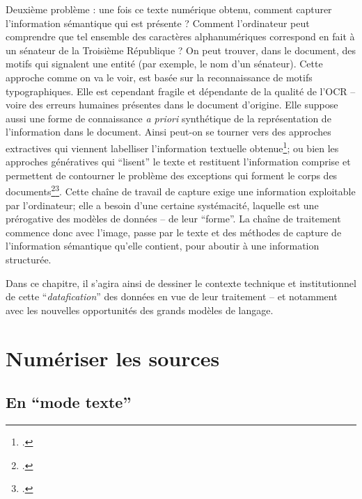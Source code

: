Deuxième problème : une fois ce texte numérique obtenu, comment capturer l'information sémantique qui est présente ? Comment l'ordinateur peut comprendre que tel ensemble des caractères alphanumériques correspond en fait à un sénateur de la Troisième République ? On peut trouver, dans le document, des motifs qui signalent une entité (par exemple, le nom d'un sénateur). Cette approche comme on va le voir, est basée sur la reconnaissance de motifs typographiques. Elle est cependant fragile et dépendante de la qualité de l'OCR -- voire des erreurs humaines présentes dans le document d'origine. Elle suppose aussi une forme de connaissance \emph{a priori} synthétique de la représentation de l'information dans le document. Ainsi peut-on se tourner vers des approches extractives qui viennent labelliser l'information textuelle obtenue\footcite[][]{finkel}; ou bien les approches génératives qui \enquote{lisent} le texte et restituent l'information comprise et permettent de contourner le problème des exceptions qui forment le corps des documents\footcite[][]{radford}\footcite[][]{devlin}. Cette chaîne de travail de capture exige une information exploitable par l'ordinateur; elle a besoin d'une certaine systémacité, laquelle est une prérogative des modèles de données -- de leur \enquote{forme}. La chaîne de traitement commence donc avec l'image, passe par le texte et des méthodes de capture de l'information sémantique qu'elle contient, pour aboutir à une information structurée. 

Dans ce chapitre, il s'agira ainsi de dessiner le contexte technique et institutionnel de cette \enquote{\emph{datafication}} des données en vue de leur traitement -- et notamment avec les nouvelles opportunités des grands modèles de langage.

\section{Numériser les sources}

\subsection{En \enquote{mode texte}}

